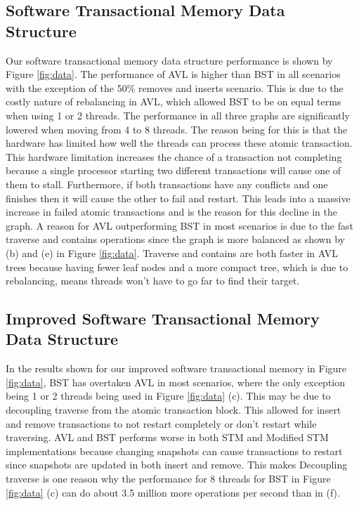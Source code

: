 \documentclass[conference]{IEEEtran}
\theoremstyle{definition}
\theoremstyle{theorem}
\begin{document}
\subsection{Software Transactional Memory Data Structure}
Our software transactional memory data structure performance is shown by Figure \ref{fig:data}. The performance of AVL is higher than BST in all scenarios with the exception of the 50\% removes and inserts scenario. This is due to the costly nature of rebalancing in AVL, which allowed BST to be on equal terms when using 1 or 2 threads. The performance in all three graphs are significantly lowered when moving from 4 to 8 threads. The reason being for this is that the hardware has limited how well the threads can process these atomic transaction. This hardware limitation increases the chance of a transaction not completing because a single processor starting two different transactions will cause one of them to stall. Furthermore, if both transactions have any conflicts and one finishes then it will cause the other to fail and restart. This leads into a massive increase in failed atomic transactions and is the reason for this decline in the graph. A reason for AVL outperforming BST in most scenarios is due to the fast traverse and contains operations since the graph is more balanced as shown by (b) and (e) in Figure \ref{fig:data}. Traverse and contains are both faster in AVL trees because having fewer leaf nodes and a more compact tree, which is due to rebalancing, means threads won't have to go far to find their target.


\subsection{Improved Software Transactional Memory Data Structure}
In the results shown for our improved software transactional memory in Figure \ref{fig:data}, BST has overtaken AVL in most scenarios, where the only exception being 1 or 2 threads being used in Figure \ref{fig:data} (c). This may be due to decoupling traverse from the atomic transaction block. This allowed for insert and remove transactions to not restart completely or don't restart while traversing. AVL and BST performs worse in both STM and Modified STM implementations because changing snapshots can cause transactions to restart since snapshots are updated in both insert and remove. This makes Decoupling traverse is one reason why the performance for 8 threads for BST in Figure \ref{fig:data} (c) can do about 3.5 million more operations per second than in (f). 
\end{document}
